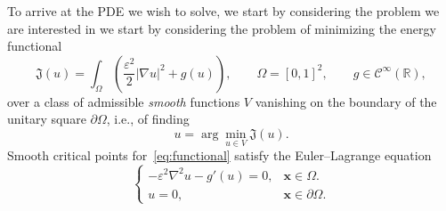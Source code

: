 \documentclass[twoside,a4paper]{refart}
\theoremstyle{definition}
\begin{document}
To arrive at the PDE we wish to solve, we start by considering the problem we are interested in we start by considering the problem of minimizing the energy functional 
\begin{equation}\label{eq:functional}
\mathfrak{J}(u) = \int_{\Omega} \left( \frac{\varepsilon^2}{2} |\nabla u|^2 + g(u) \right), \qquad \Omega = [0,1]^2, \qquad g \in \mathcal{C}^\infty(\mathbb{R}),
\end{equation}
over a class of admissible \emph{smooth} functions $V$ vanishing on the boundary of the unitary square $\partial\Omega$, i.e., of finding
\begin{equation*}
u = \arg\min_{u \in V} \mathfrak{J}(u).
\end{equation*}
Smooth critical points for~\eqref{eq:functional} satisfy the Euler--Lagrange equation
\begin{equation}\label{eq:nonlinear_model}
\begin{cases}
-\varepsilon^2 \nabla^2 u - g'(u) = 0, &  \mathbf{x} \in \Omega. \\
u = 0, & \mathbf{x} \in \partial \Omega.
\end{cases}
\end{equation}
\end{document}

